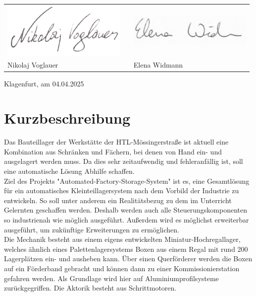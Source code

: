 \documentclass[12pt, twoside]{article}
\begin{document}
\begin{center}
    
    \begin{tabular}{P{67mm}cP{67mm}}
        \includegraphics[width=60mm]{sign_voglauer.png} & & \includegraphics[width=60mm]{sign_widmann.jpg} \\
        Nikolaj Voglauer & & Elena Widmann\\
    \end{tabular}

    \vspace*{\fill}
    \raggedleft Klagenfurt, am 04.04.2025

\end{center}

\newpage

\pagestyle{fancy}
\normalsize

\section*{Kurzbeschreibung}

Das Bauteillager der Werkstätte der HTL-Mössingerstraße ist aktuell eine Kombination aus Schränken und Fächern, bei denen von Hand ein- und ausgelagert werden muss. Da dies sehr zeitaufwendig und fehleranfällig ist, soll eine automatische Lösung Abhilfe schaffen. \\

Ziel des Projekts "Automated-Factory-Storage-System" ist es, eine Gesamtlösung für ein automatisches Kleinteillagersystem nach dem Vorbild der Industrie zu entwickeln. So soll unter anderem ein Realitätsbezug zu dem im Unterricht Gelernten geschaffen werden. Deshalb werden auch alle Steuerungskomponenten so industrienah wie möglich ausgeführt. Außerdem wird es möglichst erweiterbar ausgeführt, um zukünftige Erweiterungen zu ermöglichen.\\

Die Mechanik besteht aus einem eigens entwickelten Miniatur-Hochregallager, welches ähnlich eines Palettenlagersystems Boxen aus einem Regal mit rund 200 Lagerplätzen ein- und ausheben kann. Über einen Querförderer werden die Boxen auf ein Förderband gebracht und können dann zu einer Kommissionierstation gefahren werden. Als Grundlage wird hier auf Aluminiumprofilsysteme zurückgegriffen. Die Aktorik besteht aus Schrittmotoren.\\
\end{document}
